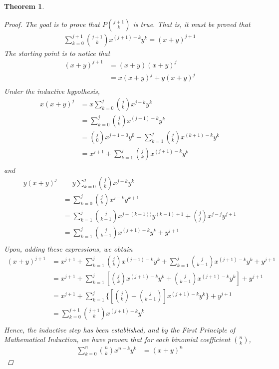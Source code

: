 \documentclass{book}
\newtheorem{theorem}{Theorem}[section]
\theoremstyle{definition}
\theoremstyle{remark}
\begin{document}
\begin{theorem}
\begin{proof}
        The goal is to prove that $P\binom{j+1}{k}$ is true. That is, it must be proved that  
            \begin{align*}
                \sum_{k=0}^{j+1} \binom{j+1}{k}x^{(j+1)-k}y^k = (x + y)^{j+1}
            \end{align*}
        The starting point is to notice that 
            \begin{align*}
                (x + y)^{j+1} &= (x+y)(x+y)^j \\
                    &= x(x+y)^j + y(x+y)^j \\
            \end{align*}
        Under the inductive hypothesis, 
            \begin{align*}
                x(x+y)^j &= x \sum_{k=0}^{j} \binom{j}{k}x^{j-k}y^k \\
                    &= \sum_{k=0}^{j} \binom{j}{k}x^{(j+1)-k}y^k \\
                    &= \binom{j}{0}x^{j+1-0}y^0 + \sum_{k=1}^{j} \binom{j}{k}x^{(k+1)-k}y^k \\
                    &= x^{j+1} + \sum_{k=1}^{j} \binom{j}{k}x^{(j+1)-k}y^k \\
            \end{align*}
        and 
            \begin{align*}
                y(x+y)^j &= y \sum_{k=0}^{j} \binom{j}{k}x^{j-k}y^k \\
                    &= \sum_{k=0}^{j} \binom{j}{k}x^{j-k}y^{k+1} \\
                    & = \sum_{k=1}^{j} \binom{j}{k-1}x^{j-(k-1))}y^{(k-1) + 1} + \binom{j}{j} x^{j-j} y^{j+1} \\
                    &= \sum_{k=1}^{j} \binom{j}{k-1}x^{(j+1)-k}y^k + y^{j+1} \\
            \end{align*}
        Upon, adding these expressions, we obtain
            \begin{align*}
                (x+y)^{j+1} &= x^{j+1} + \sum_{k=1}^{j} \binom{j}{k}x^{(j+1)-k}y^k + \sum_{k=1}^{j} \binom{j}{k-1}x^{(j+1)-k}y^k + y^{j+1} \\
                    &= x^{j+1} + \sum_{k=1}^{j} [\binom{j}{k}x^{(j+1)-k}y^k + \binom{j}{k-1}x^{(j+1)-k}y^k ] + y^{j+1} \\
                    &= x^{j+1} + \sum_{k=1}^{j} \{ [\binom{j}{k} + \binom{j}{k-1}]x^{(j+1) - k}y^k  \} + y^{j+1} \\
                    &= \sum_{k=0}^{j+1} \binom{j+1}{k} x^{(j+1)-k}y^k \\
            \end{align*}
        Hence, the inductive step has been established, and by the First Principle of Mathematical Induction, we have proven that for each binomial coefficient $\binom{n}{k}$, 
            \begin{align*}
                \sum_{k=0}^{n} \binom{n}{k}x^{n-k}y^k & = (x + y)^n
            \end{align*}            
    \end{proof}
\end{theorem}
\end{document}
